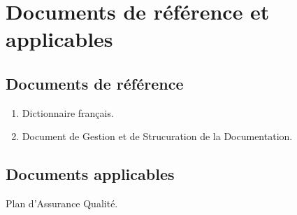 
\section{Documents de référence et applicables}
    
    \subsection{Documents de référence}
    \begin{enumerate}
        \item Dictionnaire français.
        \item Document de Gestion et de Strucuration de la Documentation.
    \end{enumerate}
    \subsection{Documents applicables}
        Plan d'Assurance Qualité.
